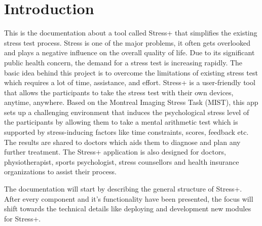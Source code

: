 \section{Introduction}
\label{sec:introduction}

This is the documentation about a tool called Stress+ that simplifies the existing stress test process. 
Stress is one of the major problems, it often gets overlooked and plays a negative influence on the overall quality of life. 
Due to its significant public health concern, the demand for a stress test is increasing rapidly. 
The basic idea behind this project is to overcome the limitations of existing stress test which requires a lot of time, assistance, and effort. 
Stress+ is a user-friendly tool that allows the participants to take the stress test with their own devices, anytime, anywhere. 
Based on the Montreal Imaging Stress Task (MIST), this app sets up a challenging environment that induces the psychological stress level of the participants by allowing them to take a mental arithmetic test which is supported by stress-inducing factors like time constraints, scores, feedback etc. 
The results are shared to doctors which aids them to diagnose and plan any further treatment.
The Stress+ application is also designed for doctors, physiotherapist, sports psychologist, stress counsellors and health insurance organizations to assist their process.

The documentation will start by describing the general structure of Stress+.
After every component and it's functionality have been presented, the focus will shift towards the technical details like deploying and development new modules for Stress+.
